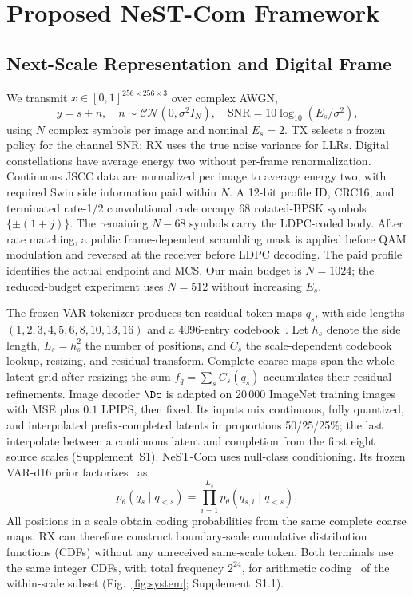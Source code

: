 \section{Proposed NeST-Com Framework}
\subsection{Next-Scale Representation and Digital Frame}
We transmit $x\in[0,1]^{256\times256\times3}$ over complex AWGN,
\begin{equation}
 y=s+n,\quad n\sim\mathcal{CN}(0,\sigma^2 I_N),\quad
 \mathrm{SNR}=10\log_{10}(E_s/\sigma^2),
 \label{eq:channel}
\end{equation}
using $N$ complex symbols per image and nominal $E_s=2$. TX selects a frozen policy for the channel SNR; RX uses the true noise variance for LLRs. Digital constellations have average energy two without per-frame renormalization. Continuous JSCC data are normalized per image to average energy two, with required Swin side information paid within $N$. A 12-bit profile ID, CRC16, and terminated rate-1/2 convolutional code occupy 68 rotated-BPSK symbols $\{\pm(1+j)\}$. The remaining $N-68$ symbols carry the LDPC-coded body. After rate matching, a public frame-dependent scrambling mask is applied before QAM modulation and reversed at the receiver before LDPC decoding. The paid profile identifies the actual endpoint and MCS. Our main budget is $N=1024$; the reduced-budget experiment uses $N=512$ without increasing $E_s$.

The frozen VAR tokenizer produces ten residual token maps $q_s$, with side lengths $(1,2,3,4,5,6,8,10,13,16)$ and a 4096-entry codebook~\cite{var}. Let $h_s$ denote the side length, $L_s=h_s^2$ the number of positions, and $C_s$ the scale-dependent codebook lookup, resizing, and residual transform. Complete coarse maps span the whole latent grid after resizing; the sum $f_q=\sum_s C_s(q_s)$ accumulates their residual refinements. Image decoder $\Dc$ is adapted on 20\,000 ImageNet training images with MSE plus $0.1$ LPIPS, then fixed. Its inputs mix continuous, fully quantized, and interpolated prefix-completed latents in proportions 50/25/25\%; the last interpolate between a continuous latent and completion from the first eight source scales (Supplement~S1). NeST-Com uses null-class conditioning. Its frozen VAR-d16 prior factorizes~\cite{var} as
\begin{equation}
 p_\theta(q_s\mid q_{<s})=\prod_{i=1}^{L_s}p_\theta(q_{s,i}\mid q_{<s}),
 \label{eq:prior}
\end{equation}
All positions in a scale obtain coding probabilities from the same complete coarse maps. RX can therefore construct boundary-scale cumulative distribution functions (CDFs) without any unreceived same-scale token. Both terminals use the same integer CDFs, with total frequency $2^{24}$, for arithmetic coding~\cite{arithmetic} of the within-scale subset (Fig.~\ref{fig:system}; Supplement~S1.1).

